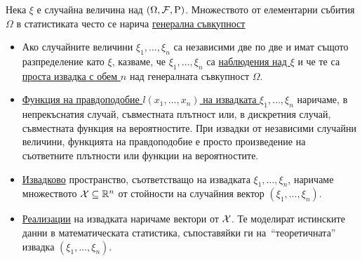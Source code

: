 \documentclass[numbers=endperiod, DIV=15, bibliography=totocnumbered]{scrartcl}
\begin{document}
\begin{definition}[Извадки]
  Нека $\xi$ е случайна величина над $(\Omega, \mathcal{F}, \operatorname{P})$. Множеството от елементарни събития $\Omega$ в статистиката често се нарича \uline{генерална съвкупност}

  \begin{itemize}
    \item Ако случайните величини $\xi_1, \ldots, \xi_n$ са независими две по две и имат същото разпределение като $\xi$, казваме, че $\xi_1, \ldots, \xi_n$ са \uline{наблюдения над $\xi$} и че те са \uline{проста извадка с обем $n$} над генералната съвкупност $\Omega$.
    \item \uline{Функция на правдоподобие $l(x_1, \ldots, x_n)$ на извадката $\xi_1, \ldots, \xi_n$} наричаме, в непрекъснатия случай, съвместната плътност или, в дискретния случай, съвместната функция на вероятностите. При извадки от независими случайни величини, функцията на правдоподобие е просто произведение на съответните плътности или функции на вероятностите.
    \item \uline{Извадково} пространство, съответстващо на извадката $\xi_1, \ldots, \xi_n$, наричаме множеството $\mathcal{X} \subseteq \mathbb{R}^n$ от стойности на случайния вектор $(\xi_1, \ldots, \xi_n)$.
    \item \uline{Реализации} на извадката наричаме вектори от $\mathcal{X}$. Те моделират истинските данни в математическата статистика, съпоставяйки ги на~\enquote{теоретичната} извадка $(\xi_1, \ldots, \xi_n)$.
  \end{itemize}
\end{definition}
\end{document}
